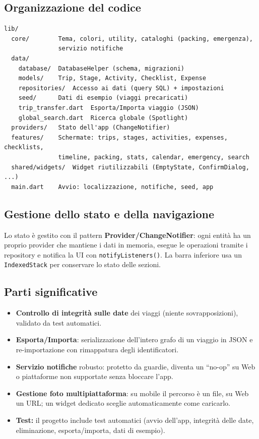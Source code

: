 \documentclass[11pt, a4paper]{article}
\begin{document}
\subsection{Organizzazione del codice}
\begin{lstlisting}
lib/
  core/        Tema, colori, utility, cataloghi (packing, emergenza),
               servizio notifiche
  data/
    database/  DatabaseHelper (schema, migrazioni)
    models/    Trip, Stage, Activity, Checklist, Expense
    repositories/  Accesso ai dati (query SQL) + impostazioni
    seed/      Dati di esempio (viaggi precaricati)
    trip_transfer.dart  Esporta/Importa viaggio (JSON)
    global_search.dart  Ricerca globale (Spotlight)
  providers/   Stato dell'app (ChangeNotifier)
  features/    Schermate: trips, stages, activities, expenses, checklists,
               timeline, packing, stats, calendar, emergency, search
  shared/widgets/  Widget riutilizzabili (EmptyState, ConfirmDialog, ...)
  main.dart    Avvio: localizzazione, notifiche, seed, app
\end{lstlisting}

\subsection{Gestione dello stato e della navigazione}
Lo stato è gestito con il pattern \textbf{Provider/ChangeNotifier}: ogni entità
ha un proprio provider che mantiene i dati in memoria, esegue le operazioni
tramite i repository e notifica la UI con \texttt{notifyListeners()}. La barra
inferiore usa un \texttt{IndexedStack} per conservare lo stato delle sezioni.

\subsection{Parti significative}
\begin{itemize}[noitemsep]
    \item \textbf{Controllo di integrità sulle date} dei viaggi (niente
    sovrapposizioni), validato da test automatici.
    \item \textbf{Esporta/Importa}: serializzazione dell'intero grafo di un
    viaggio in JSON e re-importazione con rimappatura degli identificatori.
    \item \textbf{Servizio notifiche} robusto: protetto da guardie, diventa un
    ``no-op'' su Web o piattaforme non supportate senza bloccare l'app.
    \item \textbf{Gestione foto multipiattaforma}: su mobile il percorso è un file,
    su Web un URL; un widget dedicato sceglie automaticamente come caricarlo.
    \item \textbf{Test:} il progetto include test automatici (avvio dell'app,
    integrità delle date, eliminazione, esporta/importa, dati di esempio).
\end{itemize}
\end{document}
